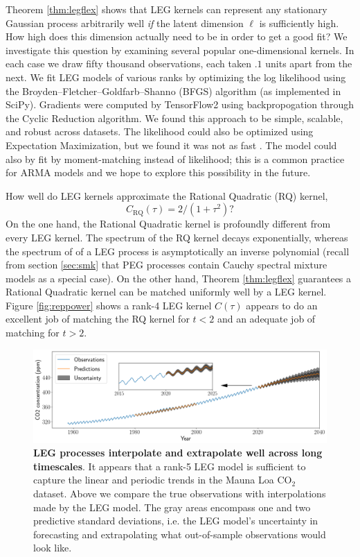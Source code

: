 \documentclass{article}
\theoremstyle{definition}
\begin{document}
Theorem \ref{thm:legflex} shows that LEG kernels can represent any stationary Gaussian process arbitrarily well \emph{if} the latent dimension $\ell$ is sufficiently high.  How high does this dimension actually need to be in order to get a good fit?  We investigate this question by examining several popular one-dimensional kernels.  In each case we draw fifty thousand observations, each taken $.1$ units apart from the next.  We fit LEG models of various ranks by optimizing the log likelihood using the Broyden–Fletcher–Goldfarb–Shanno (BFGS) algorithm (as implemented in SciPy).  Gradients were computed by TensorFlow2 using backpropogation through the Cyclic Reduction algorithm.   We found this approach to be simple, scalable, and robust across datasets.  The likelihood could also be optimized using Expectation Maximization, but we found it was not as fast \cite{dempster1977maximum}.  The model could also by fit by moment-matching instead of likelihood; this is a common practice for ARMA models \cite{brockwell2013time} and we hope to explore this possibility in the future. 

How well do LEG kernels approximate the Rational Quadratic (RQ) kernel,
\[
C_{\mathrm{RQ}}(\tau) = 2/ (1 + \tau^2)?
\]
On the one hand, the Rational Quadratic kernel is profoundly different from every LEG kernel.  The spectrum of the RQ kernel decays exponentially, whereas the spectrum of of a LEG process is asymptotically an inverse polynomial (recall from section \ref{sec:smk} that PEG processes contain Cauchy spectral mixture models as a special case).  On the other hand, Theorem \ref{thm:legflex} guarantees a Rational Quadratic kernel can be matched uniformly well by a LEG kernel.  Figure \ref{fig:reppower} shows a rank-4 LEG kernel $C(\tau)$ appears to do an excellent job of matching the RQ kernel for $t<2$ and an adequate job of matching for $t>2$.  

\begin{figure}[t!]
\vskip 0.2in
\begin{center}
\centerline{\includegraphics[width=2\columnwidth]{pics/mlc02}}
\caption{\textbf{LEG processes interpolate and extrapolate well across long timescales}.  It appears that a rank-5 LEG model is sufficient to capture the linear and periodic trends in the Mauna Loa CO$_2$ dataset.  Above we compare the true observations with interpolations made by the LEG model.  The gray areas encompass one and two predictive standard deviations, i.e. the LEG model's uncertainty in forecasting and extrapolating what out-of-sample observations would look like.}
\label{fig:realdata}
\end{center}
\vskip -0.2in
\end{figure}
\end{document}
